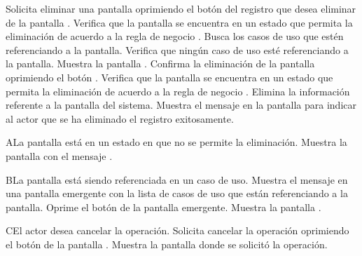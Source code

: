  \begin{UCtrayectoria}
    \UCpaso[\UCactor] Solicita eliminar una pantalla oprimiendo el botón \btnEliminar del registro que desea eliminar de la pantalla .
    \UCpaso[\UCsist] Verifica que la pantalla se encuentra en un estado que permita la eliminación de acuerdo a la regla de negocio . 
    \UCpaso[\UCsist] Busca los casos de uso que estén referenciando a la pantalla.
    \UCpaso[\UCsist] Verifica que ningún caso de uso esté referenciando a la pantalla. 
    \UCpaso[\UCsist] Muestra la pantalla . 
    \UCpaso[\UCactor] Confirma la eliminación de la pantalla oprimiendo el botón . 
    \UCpaso[\UCsist] Verifica que la pantalla se encuentra en un estado que permita la eliminación de acuerdo a la regla de negocio . 
    \UCpaso[\UCsist] Elimina la información referente a la pantalla del sistema.
    \UCpaso[\UCsist] Muestra el mensaje  en la pantalla 
    para indicar al actor que se ha eliminado el registro exitosamente.
 \end{UCtrayectoria}
 
 \begin{UCtrayectoriaA}{A}{La pantalla está en un estado en que no se permite la eliminación.}
    \UCpaso[\UCsist] Muestra la pantalla  con el mensaje .
 \end{UCtrayectoriaA} 
 \begin{UCtrayectoriaA}{B}{La pantalla está siendo referenciada en un caso de uso.}
    \UCpaso[\UCsist] Muestra el mensaje  en una pantalla emergente
    con la lista de casos de uso que están referenciando a la pantalla.
    \UCpaso[\UCactor] Oprime el botón  de la pantalla emergente.
    \UCpaso[\UCsist] Muestra la pantalla .
 \end{UCtrayectoriaA}
 \begin{UCtrayectoriaA}{C}{El actor desea cancelar la operación.}
    \UCpaso[\UCactor] Solicita cancelar la operación oprimiendo el botón  de la pantalla .
    \UCpaso[\UCsist] Muestra la pantalla donde se solicitó la operación.
 \end{UCtrayectoriaA} 